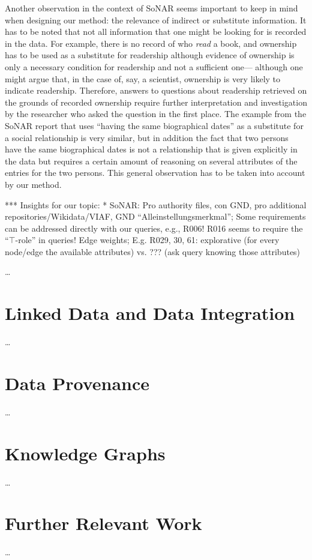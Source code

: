 Another observation in the context of SoNAR seems important to keep in mind
when designing our method: the relevance of indirect or substitute information.
It has to be noted that not all information that one might be looking for is recorded
in the data. For example, there is no record of who \emph{read} a book,
and ownership has to be used as a substitute for readership although evidence
of ownership is only a necessary condition for readership and not a sufficient one---%
although one might argue that, in the case of, say, a scientist, ownership is very likely
to indicate readership.
Therefore, answers to questions
about readership retrieved on the grounds of recorded ownership require further interpretation and investigation
by the researcher who asked the question in the first place.
The example from the SoNAR report that uses \enquote{having the same biographical dates}
as a substitute for a social relationship is very similar, but in addition
the fact that two persons have the same biographical dates is not a relationship that is
given explicitly in the data but requires a certain amount of reasoning on several attributes of the entries
for the two persons.
This general observation has to be taken into account by our method.



*** Insights for our topic:
* SoNAR: 
  Pro authority files, con GND, pro additional repositories/Wikidata/VIAF, GND \enquote{Alleinstellungsmerkmal}; 
  Some requirements can be addressed directly with our queries, e.g., R006!
  R016 seems to require the \enquote{$\top$-role} in queries!
  Edge weights;
  E.g. R029, 30, 61: explorative (for every node/edge the available attributes) vs. ??? (ask query knowing those attributes)



\dots

\section{Linked Data and Data Integration}
\label{sec:linked_data+integration}

\dots


\section{Data Provenance}
\label{sec:data_provenance}

\dots


\section{Knowledge Graphs}
\label{sec:KGs}

\dots


\section{Further Relevant Work}
\label{sec:further}

\dots


